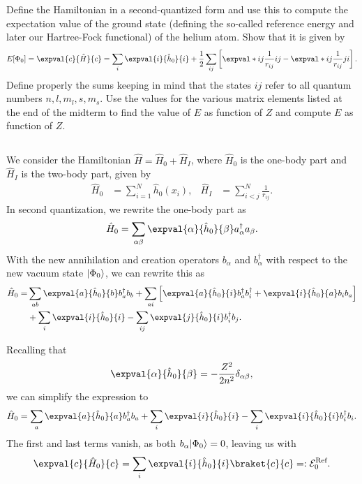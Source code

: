 Define the Hamiltonian in a second-quantized form and use this to compute the expectation value of the ground state (defining the so-called reference energy and later our Hartree-Fock functional) of
the helium atom.
Show that it is given by
\begin{equation}
    E[\Phi_0] = \expval{c}{\hat{H}}{c} = \sum_{i} \expval{i}{\hat{h}_0}{i} + \frac{1}{2} \sum_{ij} \left[\expval*{ij}{\frac{1}{r_{ij}}}{ij} - \expval*{ij}{\frac{1}{r_{ij}}}{ji}\right].
\end{equation}
Define properly the sums keeping in mind that the states $ij$ refer to all quantum numbers $n, l, m_l, s, m_s$.
Use the values for the various matrix elements listed at the end of the midterm to find the value of $E$ as function of $Z$ and compute $E$ as function of $Z$.

\subsection{}
We consider the Hamiltonian $\hat{H} = \hat{H}_0 + \hat{H}_I$, where $\hat{H}_0$ is the one-body part and $\hat{H}_I$ is the two-body part, given by
\begin{align*}
    \hat{H}_0 &= \sum_{i=1}^{N}\hat{h}_0(x_i), &
    \hat{H}_I &= \sum_{i<j}^{N}\frac{1}{r_{ij}}.
\end{align*}
In second quantization, we rewrite the one-body part as
\begin{equation}
    \hat{H}_0 = \sum_{\alpha\beta} \expval{\alpha}{\hat{h}_0}{\beta} a_\alpha^\dagger a_\beta.
\end{equation}
With the new annihilation and creation operators $b_\alpha$ and $b_\alpha^\dagger$ with respect to the new vacuum state $\ket*{\Phi_0}$, we can rewrite this as
\begin{equation}\label{eq:H0_second_quant}
    \begin{split}
        \hat{H}_0 =& \sum_{ab} \expval{a}{\hat{h}_0}{b} b_a^\dagger b_b + \sum_{ai} \left[ \expval{a}{\hat{h}_0}{i} b_a^\dagger b_i^\dagger + \expval{i}{\hat{h}_0}{a} b_i b_a \right] \\
        &+ \sum_{i} \expval{i}{\hat{h}_0}{i} - \sum_{ij} \expval{j}{\hat{h}_0}{i} b_i^\dagger b_j.
    \end{split}
\end{equation}

Recalling that
\begin{equation*}
    \expval{\alpha}{\hat{h}_0}{\beta} = -\frac{Z^2}{2n^2}\delta_{\alpha \beta},
\end{equation*}
we can simplify the expression to
\begin{equation*}
    \hat{H}_0 = \sum_{a} \expval{a}{\hat{h}_0}{a} b_a^\dagger b_a + \sum_{i} \expval{i}{\hat{h}_0}{i} - \sum_{i} \expval{i}{\hat{h}_0}{i} b_i^\dagger b_i.
\end{equation*}
The first and last terms vanish, as both $b_\alpha \ket*{\Phi_0} = 0$, leaving us with
\begin{equation}
    \expval{c}{\hat{H}_0}{c} = \sum_{i} \expval{i}{\hat{h}_0}{i} \braket{c}{c} =: \mathcal{E}_0^{\text{Ref}}.
\end{equation}


